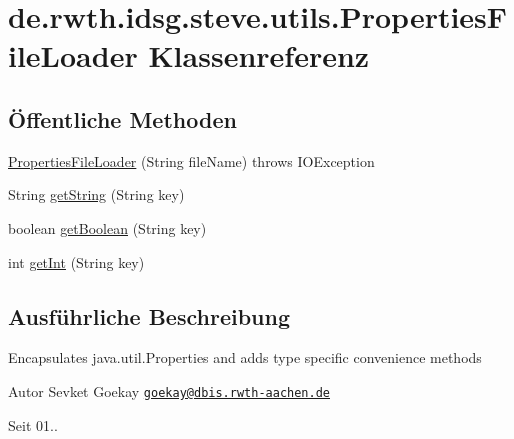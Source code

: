 \hypertarget{classde_1_1rwth_1_1idsg_1_1steve_1_1utils_1_1_properties_file_loader}{\section{de.\-rwth.\-idsg.\-steve.\-utils.\-Properties\-File\-Loader Klassenreferenz}
\label{classde_1_1rwth_1_1idsg_1_1steve_1_1utils_1_1_properties_file_loader}
}
\subsection*{Öffentliche Methoden}
\begin{DoxyCompactItemize}
\item 
\hyperlink{classde_1_1rwth_1_1idsg_1_1steve_1_1utils_1_1_properties_file_loader_a51534f72b7b89c197dca02b31be9d8ea}{Properties\-File\-Loader} (String file\-Name)  throws I\-O\-Exception 
\item 
String \hyperlink{classde_1_1rwth_1_1idsg_1_1steve_1_1utils_1_1_properties_file_loader_ae13c6ffe9a581ad909c8f9a8d9327104}{get\-String} (String key)
\item 
boolean \hyperlink{classde_1_1rwth_1_1idsg_1_1steve_1_1utils_1_1_properties_file_loader_ab62b3309d536a7c02d2cc8e55082f24b}{get\-Boolean} (String key)
\item 
int \hyperlink{classde_1_1rwth_1_1idsg_1_1steve_1_1utils_1_1_properties_file_loader_ae1e0d379b046c4b1cd36c79bc89c71a1}{get\-Int} (String key)
\end{DoxyCompactItemize}


\subsection{Ausführliche Beschreibung}
Encapsulates java.\-util.\-Properties and adds type specific convenience methods

\begin{DoxyAuthor}{Autor}
Sevket Goekay \href{mailto:goekay@dbis.rwth-aachen.de}{\tt goekay@dbis.\-rwth-\/aachen.\-de} 
\end{DoxyAuthor}
\begin{DoxySince}{Seit}
01.. 
\end{DoxySince}


